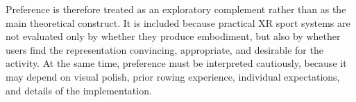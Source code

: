 Preference is therefore treated as an exploratory complement rather than as the main theoretical construct. It is included because practical XR sport systems are not evaluated only by whether they produce embodiment, but also by whether users find the representation convincing, appropriate, and desirable for the activity. At the same time, preference must be interpreted cautiously, because it may depend on visual polish, prior rowing experience, individual expectations, and details of the implementation.
